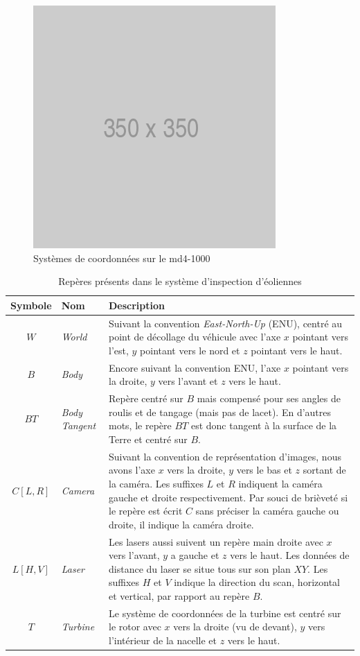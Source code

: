\begin{figure}[htp]
  \centering
  \includegraphics[width=0.5\linewidth]{images/placeholder.png}
  \caption{Systèmes de coordonnées sur le md4-1000}
  \label{fig:md41000}
\end{figure}

\begin{table}[htp]
  \centering
  \setlength{\tabcolsep}{12pt}
  \begin{tabular}[htp]{|c|l|p{10cm}|}
    \hline
    Symbole & Nom                   & Description\\\hline
    $W$     &  \textit{World}       & Suivant la convention \textit{East-North-Up} (ENU), centré au point de décollage du véhicule avec l'axe $x$ pointant vers l'est, $y$ pointant vers le nord et $z$ pointant vers le haut.\\ \hline
    $B$     &  \textit{Body}        & Encore suivant la convention ENU, l'axe $x$ pointant vers la droite, $y$ vers l'avant et $z$ vers le haut. \\ \hline
    $\mathit{BT}$  &  \textit{Body Tangent} & Repère centré sur $B$ mais compensé pour ses angles de roulis et de tangage (mais pas de lacet). En d'autres mots, le repère ${BT}$ est donc tangent à la surface de la Terre et centré sur $B$. \\ \hline
    $\mathit{C[L,R]}$ & \textit{Camera} & Suivant la convention de représentation d'images, nous avons l'axe $x$ vers la droite, $y$ vers le bas et $z$ sortant de la caméra. Les suffixes $L$ et $R$ indiquent la caméra gauche et droite respectivement. Par souci de brièveté si le repère est écrit $C$ sans préciser la caméra gauche ou droite, il indique la caméra droite.   \\ \hline
    $\mathit{L[H,V]}$ & \textit{Laser}& Les lasers aussi suivent un repère main droite avec $x$ vers l'avant, $y$ a gauche et $z$ vers le haut. Les données de distance du laser se situe tous sur son plan $XY$. Les suffixes $H$ et $V$ indique la direction du scan, horizontal et vertical, par rapport au repère $B$. \\ \hline
    $\mathit{T}$ & \textit{Turbine} & Le système de coordonnées de la turbine est centré sur le rotor avec $x$ vers la droite (vu de devant), $y$ vers l'intérieur de la nacelle et $z$ vers le haut. \\ \hline
  \end{tabular}
  \setlength{\tabcolsep}{6pt}
  \caption{Repères présents dans le système d'inspection d'éoliennes}
  \label{table:coordinate_frames}
\end{table}

